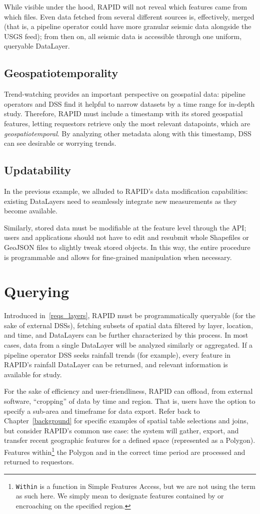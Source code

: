 While visible under the hood, RAPID will not reveal which features came from which files. Even data fetched from several different sources is, effectively, merged (that is, a pipeline operator could have more granular seismic data alongside the USGS feed); from then on, all seismic data is accessible through one uniform, queryable DataLayer.

\subsection{Geospatiotemporality}
Trend-watching provides an important perspective on geospatial data: pipeline operators and DSS find it helpful to narrow datasets by a time range for in-depth study. Therefore, RAPID must include a timestamp with its stored geospatial features, letting requestors retrieve only the most relevant datapoints, which are \textit{geospatiotemporal}. By analyzing other metadata along with this timestamp, DSS can see desirable or worrying trends.

\subsection{Updatability}
In the previous example, we alluded to RAPID's data modification capabilities: existing DataLayers need to seamlessly integrate new measurements as they become available.

Similarly, stored data must be modifiable at the feature level through the API; users and applications should not have to edit and resubmit whole Shapefiles or GeoJSON files to slightly tweak stored objects. In this way, the entire procedure is programmable and allows for fine-grained manipulation when necessary.

\section{Querying}

Introduced in~\ref{reqs_layers}, RAPID must be programmatically queryable (for the sake of external DSSs), fetching subsets of spatial data filtered by layer, location, and time, and DataLayers can be further characterized by this process. In most cases, data from a single DataLayer will be analyzed similarly or aggregated. If a pipeline operator DSS seeks rainfall trends (for example), every feature in RAPID's rainfall DataLayer can be returned, and relevant information is available for study.

For the sake of efficiency and user-friendliness, RAPID can offload, from external software, ``cropping'' of data by time and region. That is, users have the option to specify a sub-area and timeframe for data export. Refer back to Chapter~\ref{background} for specific examples of spatial table selections and joins, but consider RAPID's common use case: the system will gather, export, and transfer recent geographic features for a defined space (represented as a Polygon). Features within\footnote{\texttt{Within} is a function in Simple Features Access, but we are not using the term as such here. We simply mean to designate features contained by or encroaching on the specified region.} the Polygon and in the correct time period are processed and returned to requestors.

